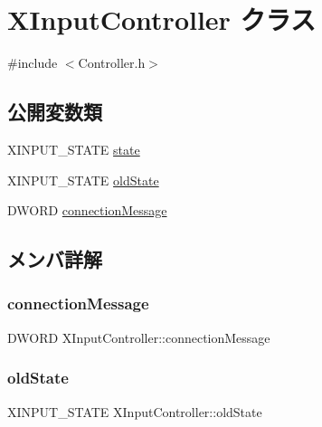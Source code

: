 \hypertarget{class_x_input_controller}{}\section{X\+Input\+Controller クラス}
\label{class_x_input_controller}


{\ttfamily \#include $<$Controller.\+h$>$}

\subsection*{公開変数類}
\begin{DoxyCompactItemize}
\item 
X\+I\+N\+P\+U\+T\+\_\+\+S\+T\+A\+TE \mbox{\hyperlink{class_x_input_controller_a36c0a2bb42c5559460653772a6ec26d1}{state}}
\item 
X\+I\+N\+P\+U\+T\+\_\+\+S\+T\+A\+TE \mbox{\hyperlink{class_x_input_controller_a686db9fe59e21e84e3cfcfbe15b518a2}{old\+State}}
\item 
D\+W\+O\+RD \mbox{\hyperlink{class_x_input_controller_a7d6ca73f305a34f74deabfeb1b342ae2}{connection\+Message}}
\end{DoxyCompactItemize}


\subsection{メンバ詳解}
\mbox{\label{class_x_input_controller_a7d6ca73f305a34f74deabfeb1b342ae2}} 
\subsubsection{\texorpdfstring{connection\+Message}{connectionMessage}}
{\footnotesize\ttfamily D\+W\+O\+RD X\+Input\+Controller\+::connection\+Message}

\mbox{\label{class_x_input_controller_a686db9fe59e21e84e3cfcfbe15b518a2}} 
\subsubsection{\texorpdfstring{old\+State}{oldState}}
{\footnotesize\ttfamily X\+I\+N\+P\+U\+T\+\_\+\+S\+T\+A\+TE X\+Input\+Controller\+::old\+State}

